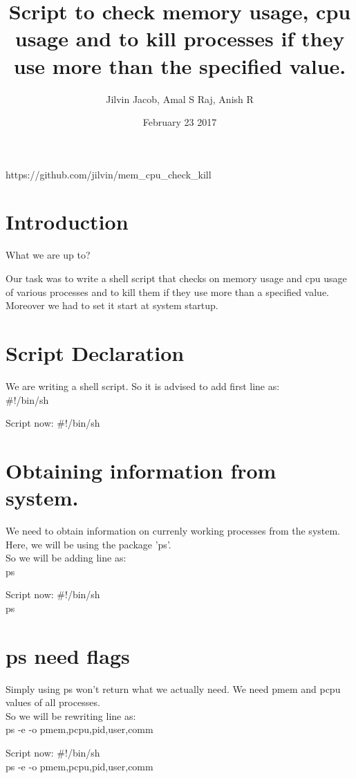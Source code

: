 \documentclass[12pt,a4paper]{article}
\title{Script to check memory usage, cpu usage and to kill processes if they use more than the specified value.}
\author{Jilvin Jacob, Amal S Raj, Anish R}
\date{February 23 2017}
\begin{document}
\maketitle
\begin{center}
https://github.com/jilvin/mem\_cpu\_check\_kill
\end{center}
\newpage
\section{Introduction}
 
What we are up to?
 
Our task was to write a shell script that checks on memory usage and cpu usage of various processes and to kill them if they use more than a specified value. Moreover we had to set it start at system startup.
\newpage
\section{Script Declaration}

We are writing a shell script. So it is advised to add first line as:\\
\#!/bin/sh
\newline
\begin{flushleft}
Script now:
\newline
\#!/bin/sh
\end{flushleft}
\newpage
\section{Obtaining information from system.}

We need to obtain information on currenly working processes from the system. Here, we will be using the package 'ps'.\\So we will be adding line as:\\
ps
\newline
\begin{flushleft}
Script now:
\newline
\#!/bin/sh\\
ps
\end{flushleft}
\newpage
\section{ps need flags}

Simply using ps won't return what we actually need. We need pmem and pcpu values of all processes.\\So we will be rewriting line as:\\
ps -e -o pmem,pcpu,pid,user,comm
\newline
\begin{flushleft}
Script now:
\newline
\#!/bin/sh\\
ps -e -o pmem,pcpu,pid,user,comm\\
\end{flushleft}
\newpage
\end{document}
